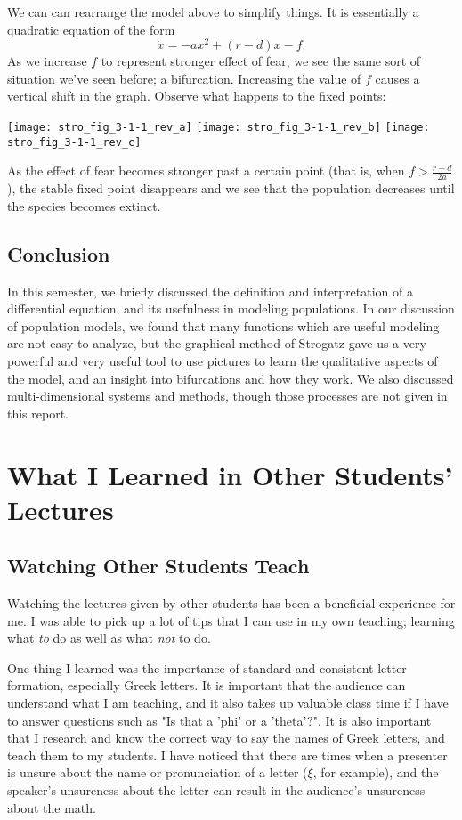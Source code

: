 \documentclass[a5paper]{article}
\theoremstyle{definition}%
\numberwithin{exercise}{section}
\theoremstyle{remark}%
\begin{document}
We can can rearrange the model above to simplify things. It is essentially a quadratic equation of the form 
$$\dot{x}=-ax^2+(r-d)x-f.$$
As we increase $f$ to represent stronger effect of fear, we see the same sort of situation we've seen before; a bifurcation. Increasing the value of $f$ causes a vertical shift in the graph. Observe what happens to the fixed points:
\begin{center}
\texttt{[image: stro\_fig\_3-1-1\_rev\_a]}
\texttt{[image: stro\_fig\_3-1-1\_rev\_b]}
\texttt{[image: stro\_fig\_3-1-1\_rev\_c]}
\end{center}
As the effect of fear becomes stronger past a certain point (that is, when $f>\frac{r-d}{2a}$), the stable fixed point disappears and we see that the population decreases until the species becomes extinct.

\subsection{Conclusion} 
In this semester, we briefly discussed the definition and interpretation of a differential equation, and its usefulness in modeling populations. In our discussion of population models, we found that many functions which are useful modeling are not easy to analyze, but the graphical method of Strogatz gave us a very powerful and  very useful tool to use pictures to learn the qualitative aspects of the model, and an insight into bifurcations and how they work. We also discussed multi-dimensional systems and methods, though those processes are not given in this report. 

\section{What I Learned in Other Students' Lectures}
\subsection{Watching Other Students Teach}
Watching the lectures given by other students has been a beneficial experience for me. I was able to pick up a lot of tips that I can use in my own teaching; learning what \emph{to} do as well as what \emph{not} to do. 

One thing I learned was the importance of standard and consistent letter formation, especially Greek letters. It is important that the audience can understand what I am teaching, and it also takes up valuable class time if I have to answer questions such as "Is that a 'phi' or a 'theta'?". It is also important that I research and know the correct way to say the names of Greek letters, and teach them to my students. I have noticed that there are times when a presenter is unsure about the name or pronunciation of a letter ($\xi$, for example), and the speaker's unsureness about the letter can result in the audience's unsureness about the math. 
\end{document}
